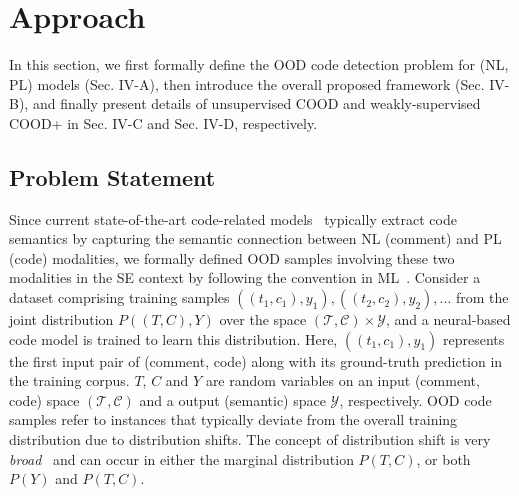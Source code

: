 \section{Approach}\label{sec:approach} 

In this section, we first formally define the OOD code detection problem for (NL, PL) models (Sec. IV-A), then introduce the overall proposed framework (Sec. IV-B), and finally present details of unsupervised COOD and weakly-supervised COOD+ in Sec. IV-C and Sec. IV-D, respectively.
\subsection{Problem Statement}

Since current state-of-the-art code-related models~\cite{guo2020graphcodebert, guo2022unixcoder} typically extract code semantics by capturing the semantic connection between NL (\ie comment) and PL (\ie code) modalities, we formally defined OOD samples involving these two modalities in the SE context by following the convention in ML~\cite{yang2021generalized, zhou2021contrastive}. Consider a dataset comprising training samples $((t_1, c_1), y_1), ((t_2, c_2), y_2), ...$ from the joint distribution $P((T, C),Y)$ over the space $\mathcal{(T, C)}\times \mathcal{Y}$, and a neural-based code model is trained to learn this distribution. Here, $((t_1, c_1), y_1)$ represents the first input pair of (comment, code) along with its ground-truth prediction in the training corpus. $T$, $C$ and $Y$ are random variables on an input (comment, code) space $\mathcal{(T, C)}$ and a output (semantic) space $\mathcal{Y}$, respectively. OOD code samples refer to instances that typically deviate from the overall training distribution due to distribution shifts. The concept of distribution shift is very \textit{broad}~\cite{yang2021generalized, salehiunified} and can occur in either the marginal distribution $P(T, C)$, or both $P(Y)$ and $P(T, C)$.


